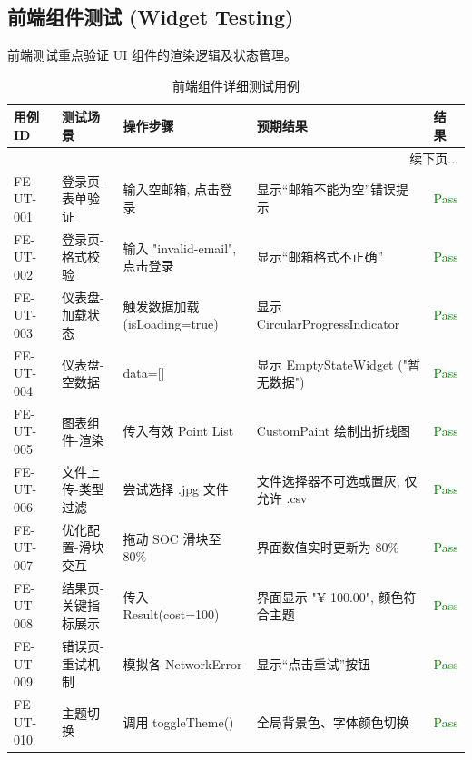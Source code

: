 \subsection{前端组件测试 (Widget Testing)}

前端测试重点验证 UI 组件的渲染逻辑及状态管理。

\begin{longtable}{|p{2.5cm}|p{4cm}|p{4cm}|p{3.5cm}|p{1.5cm}|}
    \caption{前端组件详细测试用例}                                                                                               \\
    \hline
    \textbf{用例 ID} & \textbf{测试场景} & \textbf{操作步骤}            & \textbf{预期结果}                & \textbf{结果}             \\ \hline
    \endfirsthead
    \hline
    \multicolumn{5}{|r|}{续下页...}                                                                                       \\ \hline
    \endfoot
    \hline
    \endlastfoot

    FE-UT-001      & 登录页-表单验证      & 输入空邮箱, 点击登录              & 显示“邮箱不能为空”错误提示               & \textcolor{green}{Pass} \\ \hline
    FE-UT-002      & 登录页-格式校验      & 输入 "invalid-email", 点击登录 & 显示“邮箱格式不正确”                  & \textcolor{green}{Pass} \\ \hline
    FE-UT-003      & 仪表盘-加载状态      & 触发数据加载 (isLoading=true)  & 显示 CircularProgressIndicator & \textcolor{green}{Pass} \\ \hline
    FE-UT-004      & 仪表盘-空数据       & data=[]                  & 显示 EmptyStateWidget ("暂无数据") & \textcolor{green}{Pass} \\ \hline
    FE-UT-005      & 图表组件-渲染       & 传入有效 Point List          & CustomPaint 绘制出折线图           & \textcolor{green}{Pass} \\ \hline
    FE-UT-006      & 文件上传-类型过滤     & 尝试选择 .jpg 文件             & 文件选择器不可选或置灰, 仅允许 .csv        & \textcolor{green}{Pass} \\ \hline
    FE-UT-007      & 优化配置-滑块交互     & 拖动 SOC 滑块至 80\%          & 界面数值实时更新为 80\%               & \textcolor{green}{Pass} \\ \hline
    FE-UT-008      & 结果页-关键指标展示    & 传入 Result(cost=100)      & 界面显示 "¥ 100.00", 颜色符合主题      & \textcolor{green}{Pass} \\ \hline
    FE-UT-009      & 错误页-重试机制      & 模拟各 NetworkError         & 显示“点击重试”按钮                   & \textcolor{green}{Pass} \\ \hline
    FE-UT-010      & 主题切换          & 调用 toggleTheme()         & 全局背景色、字体颜色切换                 & \textcolor{green}{Pass} \\ \hline
\end{longtable}

